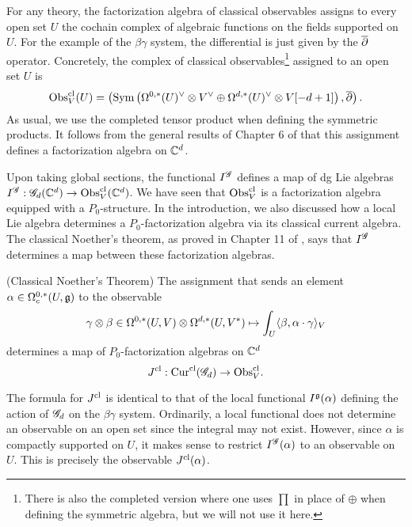 \documentclass[10pt]{amsart}
\def\Cur{{\rm Cur}}
\begin{document}

For any theory, the factorization algebra of classical observables assigns to every open set $U$ the cochain complex of algebraic functions on the fields supported on $U$.  
For the example of the $\beta\gamma$ system, the differential is just given by the $\overline{\partial}$ operator. 
Concretely, the complex of classical observables\footnote{There is also the completed version where one uses $\prod$ in place of $\oplus$ when defining the symmetric algebra, but we will not use it here.} assigned to an open set $U$ is
\[
{\rm Obs}^{{\rm cl}}_V(U) = \left({\rm Sym} \left(\Omega^{0,*}(U)^\vee \otimes V^\vee \oplus \Omega^{d,*}(U)^\vee \otimes V [-d+1]\right), \overline{\partial}\right) .
\]
As usual, we use the completed tensor product when defining the symmetric products. 
It follows from the general results of Chapter 6 of \cite{CG2} that this assignment defines a factorization algebra on $\mathbb C^d$. 

Upon taking global sections, the functional $I^{\mathscr G}$ defines a map of dg Lie algebras $I^{\mathscr G} : \mathscr G_d(\mathbb C^d) \to {\rm Obs}^{{\rm cl}}_V(\mathbb C^d)$.
We have seen that ${\rm Obs}_V^{{\rm cl}}$ is a factorization algebra equipped with a $P_0$-structure. 
In the introduction, we also discussed how a local Lie algebra determines a $P_0$-factorization algebra via its classical current algebra. 
The classical Noether's theorem, as proved in Chapter 11 of \cite{CG2}, says that $I^{\mathscr G}$ determines a map between these factorization algebras. 

\begin{prop}{\cite{[CG2]}} (Classical Noether's Theorem)
The assignment that sends an element $\alpha \in \Omega^{0,*}_c(U, \mathfrak g)$ to the observable
\[
\gamma \otimes \beta \in \Omega^{0,*}(U, V) \otimes \Omega^{d,*}(U, V^*) \mapsto \int_U \langle\beta, \alpha \cdot \gamma\rangle_V
\]
determines a map of $P_0$-factorization algebras on $\mathbb C^d$
\[
J^{\cl} : \Cur^{\cl} (\sG_d) \to \Obs^{\cl}_V .
\]
\end{prop}

\begin{rmk}
The formula for $J^{{\rm cl}}$ is identical to that of the local functional $I^\mathfrak g(\alpha)$ defining the action of $\mathscr G_d$ on the $\beta\gamma$ system.
Ordinarily, a local functional does not determine an observable on an open set since the integral may not exist.
However, since $\alpha$ is compactly supported on $U$, it makes sense to restrict $I^\mathscr G (\alpha)$ to an observable on $U$. 
This is precisely the observable $J^{{\rm cl}}(\alpha)$. 
\end{rmk}
\end{document}
